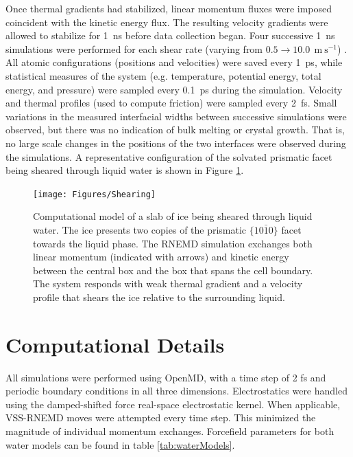 Once thermal gradients had stabilized, linear momentum fluxes were
imposed coincident with the kinetic energy flux. The resulting
velocity gradients were allowed to stabilize for 1~ns before data
collection began. Four successive 1~ns simulations were performed for
each shear rate (varying from
$0.5 \rightarrow 10.0~\mathrm{~m~s}^{-1}$) . All atomic configurations
(positions and velocities) were saved every 1~ps, while statistical
measures of the system (e.g. temperature, potential energy, total
energy, and pressure) were sampled every 0.1~ps during the
simulation. Velocity and thermal profiles (used to compute friction)
were sampled every 2~fs. Small variations in the measured interfacial
widths between successive simulations were observed, but there was no
indication of bulk melting or crystal growth. That is, no large scale
changes in the positions of the two interfaces were observed during
the simulations. A representative configuration of the solvated
prismatic facet being sheared through liquid water is shown in Figure
\ref{fig:Shearing}.

\begin{figure}
\texttt{[image: Figures/Shearing]}
\caption{\label{fig:Shearing} Computational model of a slab of ice
  being sheared through liquid water.  The ice presents two copies of
  the prismatic $\{10\bar{1}0\}$ facet towards the liquid phase.  The
  RNEMD simulation exchanges both linear momentum (indicated with
  arrows) and kinetic energy between the central box and the box that
  spans the cell boundary.  The system responds with weak thermal
  gradient and a velocity profile that shears the ice relative to the
  surrounding liquid.}
\end{figure}

\section{Computational Details}
All simulations were performed using OpenMD,\cite{OOPSE,openmd} with a
time step of 2 fs and periodic boundary conditions in all three
dimensions.  Electrostatics were handled using the damped-shifted
force real-space electrostatic kernel.\cite{Ewald} When applicable,
VSS-RNEMD moves were attempted every time step. This minimized the
magnitude of individual momentum exchanges.  Forcefield parameters for
both water models can be found in table \ref{tab:waterModels}.

